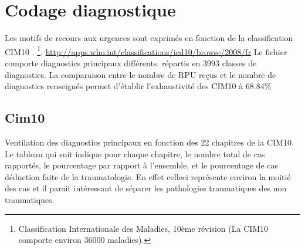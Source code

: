 \documentclass[12pt,english,french,twoside]{report}\usepackage[]{graphicx}\usepackage[]{color}
\begin{document}
\chapter{Codage diagnostique}

%




Les motifs de recours aux urgences sont exprimés en fonction de la classification CIM10 \cite{10}.
\footnote{Classification Internationale des Maladies, 10ème révision (La CIM10 comporte environ 36000 maladies).}.
\url{http://apps.who.int/classifications/icd10/browse/2008/fr}
Le fichier comporte  diagnostics principaux différents.
répartis en 3993 classes de diagnostics.
La comparaison entre le nombre de RPU reçus et le nombre de diagnostics renseignés permet d'établir l'exhaustivité des CIM10 à 68.84\% 


\section{Cim10}

Ventilation des diagnostics principaux en fonction des 22 chapitres de la CIM10. Le tableau qui suit indique pour chaque chapitre, le nombre total de cas rapportés, le pourcentage par rapport à l'ensemble, et le pourcentage de cas déduction faite de la traumatologie. En effet celleci représente environ la moitié des cas et il parait intéressant de séparer les pathologies traumatiques des non traumatiques.





\end{document}
